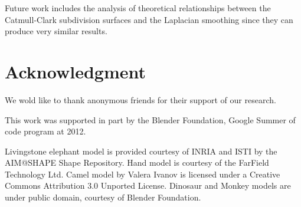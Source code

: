 \documentclass[10pt, conference]{IEEEtran}
\begin{document}
Future work includes the analysis of theoretical relationships between
the Catmull-Clark subdivision surfaces and the Laplacian smoothing
since they can produce very similar results. 



\iffinal
\section*{Acknowledgment}
%
We wold like to thank  anonymous friends for their support of our
research. 

This work was supported in part by the Blender Foundation, Google
Summer of code program at 2012. 

Livingstone elephant model is provided courtesy of INRIA and ISTI
by the AIM@SHAPE Shape Repository. Hand model is courtesy of the FarField
Technology Ltd. Camel model by Valera Ivanov is licensed under a Creative
Commons Attribution 3.0 Unported License. Dinosaur and Monkey models
are under public domain, courtesy of Blender Foundation.
\fi




\end{document}
